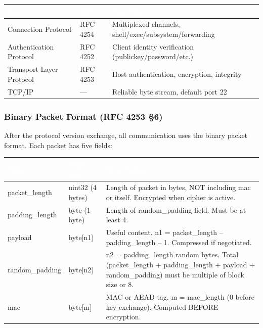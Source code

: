 \documentclass[11pt,letterpaper]{article}
\newcommand{\tableheader}[1]{\textbf{\sffamily\textcolor{white}{#1}}}
\begin{document}
\begin{center}
\begin{tabularx}{\textwidth}{L{3.5cm}L{3cm}X}
\toprule
{}
\tableheader{Layer} & \tableheader{RFC} & \tableheader{Function} \\
\midrule
Connection Protocol & RFC 4254 & Multiplexed channels, shell/exec/subsystem/forwarding \\
Authentication Protocol & RFC 4252 & Client identity verification (publickey/password/etc.) \\
Transport Layer Protocol & RFC 4253 & Host authentication, encryption, integrity \\
TCP/IP & --- & Reliable byte stream, default port 22 \\
\bottomrule
\end{tabularx}
\end{center}

\subsubsection{Binary Packet Format (RFC 4253 \S6)}

After the protocol version exchange, all communication uses the binary packet format. Each packet has five fields:

\begin{center}
\begin{tabularx}{\textwidth}{L{3cm}L{2.5cm}X}
\toprule
{}
\tableheader{Field} & \tableheader{Type / Size} & \tableheader{Description} \\
\midrule
packet\_length & uint32 (4 bytes) & Length of packet in bytes, NOT including mac or itself. Encrypted when cipher is active. \\
padding\_length & byte (1 byte) & Length of random\_padding field. Must be at least 4. \\
payload & byte[n1] & Useful content. n1 = packet\_length -- padding\_length -- 1. Compressed if negotiated. \\
random\_padding & byte[n2] & n2 = padding\_length random bytes. Total (packet\_length + padding\_length + payload + random\_padding) must be multiple of block size or 8. \\
mac & byte[m] & MAC or AEAD tag. m = mac\_length (0 before key exchange). Computed BEFORE encryption. \\
\bottomrule
\end{tabularx}
\end{center}
\end{document}
